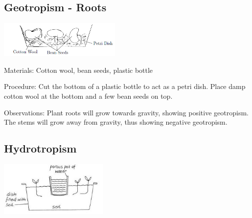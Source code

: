 \begin{multicols}{2}
\subsection{Geotropism - Roots}

\begin{center}
\includegraphics[width=0.45\textwidth]{./img/geotropism.png}
\end{center}

\begin{description*}
\item[Materials:]{Cotton wool, bean seeds, plastic bottle}
\item[Procedure:]{Cut the bottom of a plastic bottle to act as a petri dish. Place damp cotton wool at the bottom and a few bean seeds on top.}
\item[Observations:]{Plant roots will grow towards gravity, showing positive geotropism.
The stems will grow away from gravity, thus showing negative geotropism.}
\end{description*}

\subsection{Hydrotropism}

\begin{center}
\includegraphics[width=0.4\textwidth]{./img/vso/hydrotropism.jpg}
\end{center}


\end{multicols}
